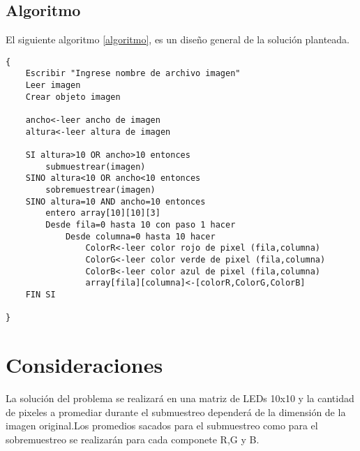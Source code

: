 \documentclass{article}
\begin{document}
\subsection{Algoritmo}
%
El siguiente algoritmo \ref{algoritmo}, es un diseño general de la solución planteada. 


\begin{lstlisting}[label=algoritmo]
{
    Escribir "Ingrese nombre de archivo imagen"
    Leer imagen
    Crear objeto imagen
    
    ancho<-leer ancho de imagen
    altura<-leer altura de imagen
    
    SI altura>10 OR ancho>10 entonces
        submuestrear(imagen)
    SINO altura<10 OR ancho<10 entonces
        sobremuestrear(imagen)
    SINO altura=10 AND ancho=10 entonces
        entero array[10][10][3]
        Desde fila=0 hasta 10 con paso 1 hacer
            Desde columna=0 hasta 10 hacer
                ColorR<-leer color rojo de pixel (fila,columna)
                ColorG<-leer color verde de pixel (fila,columna)
                ColorB<-leer color azul de pixel (fila,columna)
                array[fila][columna]<-[colorR,ColorG,ColorB]
    FIN SI

}

\end{lstlisting}

\section{Consideraciones} \label{Consideraciones}
La solución del problema se realizará en una matriz de LEDs 10x10 y la cantidad de pixeles a promediar durante el submuestreo dependerá de la dimensión de la imagen original.Los promedios sacados para el submuestreo como para el sobremuestreo se realizarán para cada componete R,G y B.
\end{document}
